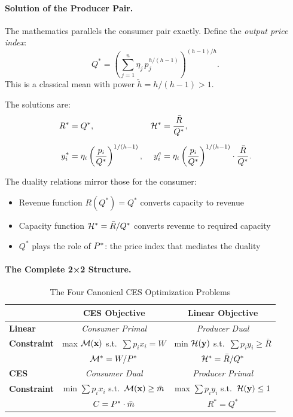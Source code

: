 \paragraph{Solution of the Producer Pair.}
The mathematics parallels the consumer pair exactly. Define the \emph{output price index}:
\begin{equation}
Q^* = \left( \sum_{j=1}^{n} \eta_j \, p_j^{h/(h-1)} \right)^{(h-1)/h}.
\end{equation}
This is a classical mean with power $\tilde{h} = h/(h-1) > 1$.

The solutions are:
\begin{align}
R^* &= Q^*, & \mathcal{H}^* &= \frac{\bar{R}}{Q^*}, \\[6pt]
y_i^* &= \eta_i \left( \frac{p_i}{Q^*} \right)^{1/(h-1)}, & y_i^c &= \eta_i \left( \frac{p_i}{Q^*} \right)^{1/(h-1)} \cdot \frac{\bar{R}}{Q^*}.
\end{align}

The duality relations mirror those for the consumer:
\begin{itemize}[leftmargin=2em]
\item Revenue function $R(Q^*) = Q^*$ converts capacity to revenue
\item Capacity function $\mathcal{H}^* = \bar{R}/Q^*$ converts revenue to required capacity
\item $Q^*$ plays the role of $P^{*}$: the price index that mediates the duality
\end{itemize}

\paragraph{The Complete 2×2 Structure.}

\begin{table}[H]
\centering
\caption{The Four Canonical CES Optimization Problems}
\label{tab:four-problems}
\renewcommand{\arraystretch}{1.5}
\begin{tabular}{@{}l|cc@{}}
\toprule
& \textbf{CES Objective} & \textbf{Linear Objective} \\
\midrule
\textbf{Linear} & \textit{Consumer Primal} & \textit{Producer Dual} \\
\textbf{Constraint} & max $\mathcal{M}(\mathbf{x})$ s.t.\ $\sum p_i x_i = W$ & min $\mathcal{H}(\mathbf{y})$ s.t.\ $\sum p_i y_i \geq \bar{R}$ \\
& $\mathcal{M}^* = W/P^{*}$ & $\mathcal{H}^* = \bar{R}/Q^*$ \\
\midrule
\textbf{CES} & \textit{Consumer Dual} & \textit{Producer Primal} \\
\textbf{Constraint} & min $\sum p_i x_i$ s.t.\ $\mathcal{M}(\mathbf{x}) \geq \bar{m}$ & max $\sum p_i y_i$ s.t.\ $\mathcal{H}(\mathbf{y}) \leq 1$ \\
& $C = P^{*} \cdot \bar{m}$ & $R^* = Q^*$ \\
\bottomrule
\end{tabular}
\end{table}

